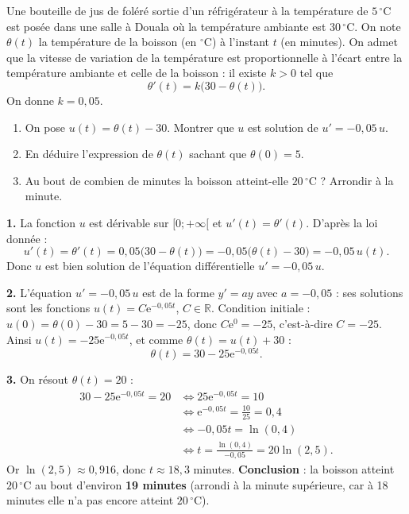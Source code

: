 \documentclass[11pt]{article}
\begin{document}
\begin{exoresolu}
Une bouteille de jus de foléré sortie d'un réfrigérateur à la température de $5\,^\circ\mathrm{C}$ est posée dans une salle à Douala où la température ambiante est $30\,^\circ\mathrm{C}$. On note $\theta(t)$ la température de la boisson (en $^\circ\mathrm{C}$) à l'instant $t$ (en minutes). On admet que la vitesse de variation de la température est proportionnelle à l'écart entre la température ambiante et celle de la boisson : il existe $k > 0$ tel que
\[ \theta'(t) = k\bigl(30 - \theta(t)\bigr). \]
On donne $k = 0{,}05$.
\begin{enumerate}
\item On pose $u(t) = \theta(t) - 30$. Montrer que $u$ est solution de $u' = -0{,}05\,u$.
\item En déduire l'expression de $\theta(t)$ sachant que $\theta(0) = 5$.
\item Au bout de combien de minutes la boisson atteint-elle $20\,^\circ\mathrm{C}$ ? Arrondir à la minute.
\end{enumerate}
\tcblower
\textbf{1.} La fonction $u$ est dérivable sur $[0 ; +\infty[$ et $u'(t) = \theta'(t)$. D'après la loi donnée :
\[ u'(t) = \theta'(t) = 0{,}05\bigl(30 - \theta(t)\bigr) = -0{,}05\bigl(\theta(t) - 30\bigr) = -0{,}05\,u(t). \]
Donc $u$ est bien solution de l'équation différentielle $u' = -0{,}05\,u$.

\textbf{2.} L'équation $u' = -0{,}05\,u$ est de la forme $y' = ay$ avec $a = -0{,}05$ : ses solutions sont les fonctions $u(t) = C\mathrm{e}^{-0{,}05t}$, $C \in \mathbb{R}$.
Condition initiale : $u(0) = \theta(0) - 30 = 5 - 30 = -25$, donc $C\mathrm{e}^{0} = -25$, c'est-à-dire $C = -25$.
Ainsi $u(t) = -25\mathrm{e}^{-0{,}05t}$, et comme $\theta(t) = u(t) + 30$ :
\[ \theta(t) = 30 - 25\mathrm{e}^{-0{,}05t}. \]

\textbf{3.} On résout $\theta(t) = 20$ :
\begin{align*}
30 - 25\mathrm{e}^{-0{,}05t} = 20 &\Longleftrightarrow 25\mathrm{e}^{-0{,}05t} = 10 \\
&\Longleftrightarrow \mathrm{e}^{-0{,}05t} = \frac{10}{25} = 0{,}4 \\
&\Longleftrightarrow -0{,}05t = \ln(0{,}4) \\
&\Longleftrightarrow t = \frac{\ln(0{,}4)}{-0{,}05} = 20\ln(2{,}5).
\end{align*}
Or $\ln(2{,}5) \approx 0{,}916$, donc $t \approx 18{,}3$ minutes.
\textbf{Conclusion} : la boisson atteint $20\,^\circ\mathrm{C}$ au bout d'environ \textbf{19 minutes} (arrondi à la minute supérieure, car à 18 minutes elle n'a pas encore atteint $20\,^\circ\mathrm{C}$).
\end{exoresolu}
\end{document}

